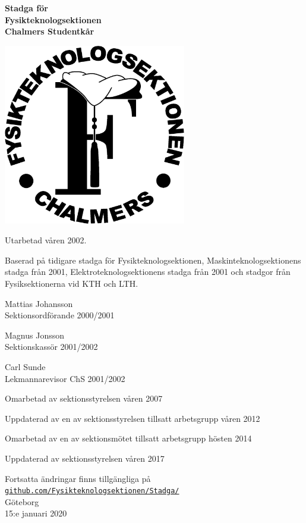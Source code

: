 \documentclass[11pt,a4paper]{article}
\begin{document}
\thispagestyle{empty} %
\begin{center}
  \textbf{\Huge{Stadga för}}\\[3mm]
  \textbf{\Huge{Fysikteknologsektionen}}\\
  \vspace{.7 cm}
  \textbf{\Large{Chalmers Studentkår}}

  \vspace{1.25em}
  \includegraphics[width=8cm]{sektionslogo.eps}
  \vspace{1.25em}

  Utarbetad våren 2002.
  
  Baserad på tidigare stadga för Fysikteknologsektionen, Maskinteknologsektionens stadga från 2001, Elektroteknologsektionens stadga från 2001 och stadgor från Fysiksektionerna vid KTH och LTH\@.
  
  Mattias Johansson\\
  Sektionsordförande 2000/2001

  Magnus Jonsson\\
  Sektionskassör 2001/2002

  Carl Sunde\\
  Lekmannarevisor ChS 2001/2002
  
  Omarbetad av sektionsstyrelsen våren 2007
  
  Uppdaterad av en av sektionsstyrelsen tillsatt arbetsgrupp våren 2012

  Omarbetad av en av sektionsmötet tillsatt arbetsgrupp hösten 2014
  
  Uppdaterad av sektionsstyrelsen våren 2017
  
  \vfill

  Fortsatta ändringar finns tillgängliga på\\
  \href{https://github.com/Fysikteknologsektionen/Stadga/commits/master}{\texttt{github.com/Fysikteknologsektionen/Stadga/}}\\[5mm]

  \small{Göteborg}\\
  \small{15:e januari 2020}
  \vspace{2.5em} %
\end{center}
\end{document}

